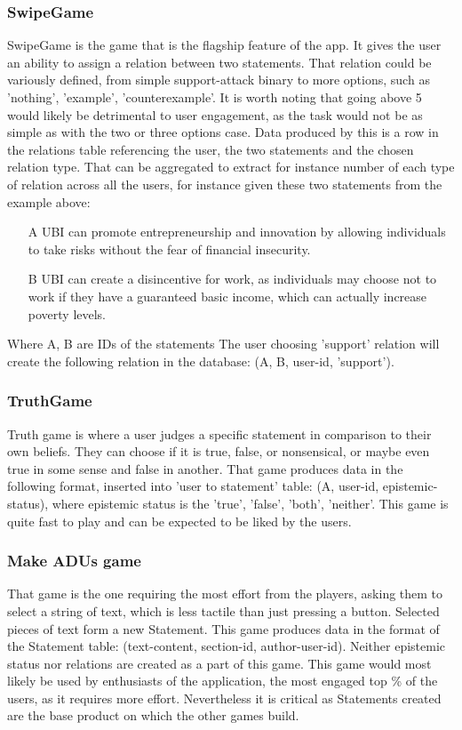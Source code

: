 \documentclass{report}
\begin{document}
\subsubsection{SwipeGame}
SwipeGame is the game that is the flagship feature of the app. It gives the user an ability to assign a relation between two statements. That relation could be variously defined, from simple support-attack binary to more options, such as 'nothing', 'example', 'counterexample'. It is worth noting that going above 5 would likely be detrimental to user engagement, as the task would not be as simple as with the two or three options case.
Data produced by this is a row in the relations table referencing the user, the two statements and the chosen relation type. That can be aggregated to extract for instance number of each type of relation across all the users, for instance given these two statements from the example above:

\begin{itemize}
  \item[A] UBI can promote entrepreneurship and innovation by allowing individuals to take risks without the fear of financial insecurity.
  \item[B] UBI can create a disincentive for work, as individuals may choose not to work if they have a guaranteed basic income, which can actually increase poverty levels.
\end{itemize}
Where A, B are IDs of the statements
The user choosing 'support' relation will create the following relation in the database: (A, B, user-id, 'support').

\subsubsection{TruthGame}
Truth game is where a user judges a specific statement in comparison to their own beliefs. They can choose if it is true, false, or nonsensical, or maybe even true in some sense and false in another. \cite{priest_many-valued_2008}
That game produces data in the following format, inserted into 'user to statement' table: (A, user-id, epistemic-status), where epistemic status is the 'true', 'false', 'both', 'neither'. 
This game is quite fast to play and can be expected to be liked by the users.

\subsubsection{Make ADUs game}
That game is the one requiring the most effort from the players, asking them to select a string of text, which is less tactile than just pressing a button. Selected pieces of text form a new Statement.
This game produces data in the format of the Statement table: (text-content, section-id, author-user-id).
Neither epistemic status nor relations are created as a part of this game. This game would most likely be used by enthusiasts of the application, the most engaged top \% of the users, as it requires more effort. Nevertheless it is critical as Statements created are the base product on which the other games build.
\end{document}
